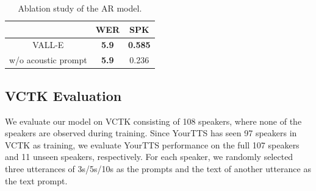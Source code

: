\documentclass{article}
\theoremstyle{plain}
\theoremstyle{definition}
\theoremstyle{remark}
\newcommand\our{\textsc{VALL-E}}
\newcommand{\cmark}{\ding{51}\xspace}%
\newcommand{\xmark}{\ding{55}\xspace}%
\begin{document}
\begin{table}[h]
\begin{center}
\caption{Ablation study of the AR model.  }
\begin{tabular}{ccc}
\toprule
   & WER & SPK  \\  \hline
    \our{}  &  \textbf{5.9}  &  \textbf{0.585} \\ 
   w/o acoustic prompt   & \textbf{5.9} & 0.236 \\ \hline
\end{tabular}
\label{exp:AR}
\end{center}
\end{table}





\subsection{VCTK Evaluation}
We evaluate our model on VCTK consisting of 108 speakers, where none of the speakers are observed during training. Since YourTTS has seen 97 speakers in VCTK as training, we evaluate YourTTS performance on the full 107 speakers and 11 unseen speakers, respectively. 
For each speaker, we randomly selected three utterances of 3s/5s/10s as the prompts and the text of another utterance as the text prompt.
\end{document}
